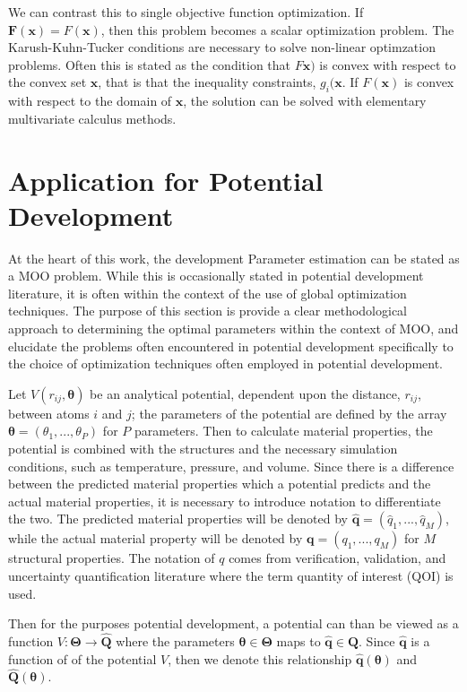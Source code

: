 We can contrast this to single objective function optimization.
If $\bm{F}(\bm{x}) = F(\bm{x})$, then this problem becomes a scalar optimization problem.
The Karush-Kuhn-Tucker conditions \cite{karush1939_kkt,kuhn1951_kkt} are necessary to solve non-linear optimzation problems.
Often this is stated as the condition that $F\bm{x})$ is convex with respect to the convex set $\bm{x}$, that is that the inequality constraints, $g_i(\bm{x}$.
If $F(\bm{x})$ is convex with respect to the domain of $\bm{x}$, the solution can be solved with elementary multivariate calculus methods.

\section{Application for Potential Development}

At the heart of this work, the development
Parameter estimation can be stated as a MOO problem.
While this is occasionally stated in potential development literature, it is often within the context of the use of global optimization techniques.
The purpose of this section is provide a clear methodological approach to determining the optimal parameters within the context of MOO, and elucidate the problems often encountered in potential development specifically to the choice of optimization techniques often employed in potential development.

Let $V(r_{ij},\bm{\theta})$ be an analytical potential, dependent upon the distance, $r_{ij}$, between atoms $i$ and $j$; the parameters of the potential are defined by the array $\bm{\theta}=(\theta_1,...,\theta_P)$ for $P$ parameters.
Then to calculate material properties, the potential is combined with the structures and the necessary simulation conditions, such as temperature, pressure, and volume.
Since there is a difference between the predicted material properties which a potential predicts and the actual material properties, it is necessary to introduce notation to differentiate the two.
The predicted material properties will be denoted by $\hat{\bm{q}} = (\hat{q}_1,...,\hat{q}_M)$, while the actual material property will be denoted by $\bm{q} = (q_1,...,q_M)$ for $M$ structural properties.  The notation of $q$ comes from verification, validation, and uncertainty quantification literature where the term quantity of interest (QOI) is used.

Then for the purposes potential development, a potential can than be viewed as a function $V:\bm{\Theta} \rightarrow \hat{\bm{Q}}$ where the parameters $\bm{\theta} \in \bm{\Theta}$ maps to $\hat{\bm{q}} \in \hat{\bm{Q}}$.
Since $\hat{\bm{q}}$ is a function of of the potential $V$, then we denote this relationship
$\hat{\bm{q}}(\bm{\theta})$ and
$\hat{\bm{Q}}(\bm{\theta})$.



